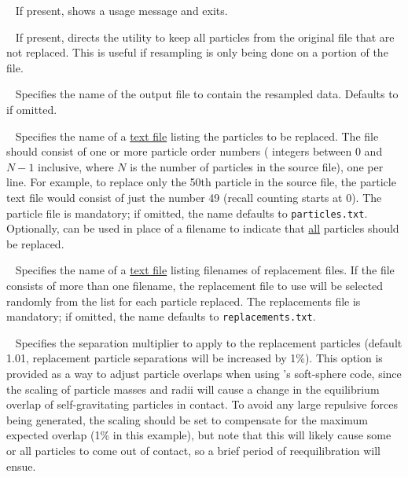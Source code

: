 \begin{description}
\item{} ~ If present, shows a usage message and exits.
\item{} ~ If present, directs the utility to keep all
  particles from the original  file that are not replaced.
  This is useful if resampling is only being done on a portion of the
   file.
\item{} ~ Specifies the name of the output
   file to contain the resampled data.  Defaults to
   if omitted.
\item{} ~ Specifies the name of a
  \underline{text file} listing the particles to be replaced.  The
  file should consist of one or more particle order numbers (\ie
  integers between 0 and $N - 1$ inclusive, where $N$ is the number of
  particles in the source file), one per line.  For example, to
  replace only the 50th particle in the source file, the particle text
  file would consist of just the number 49 (recall counting starts at
  0).  The particle file is mandatory; if omitted, the name defaults
  to \texttt{particles.txt}.  Optionally,  can be used in
  place of a filename to indicate that \underline{all} particles
  should be replaced.
\item{} ~ Specifies the name of a
  \underline{text file} listing filenames of replacement 
  files.  If the file consists of more than one  filename,
  the replacement  file to use will be selected randomly from
  the list for each particle replaced.  The replacements file is
  mandatory; if omitted, the name defaults to
  \texttt{replacements.txt}.
\item{} ~ Specifies the separation multiplier
  to apply to the replacement particles (default 1.01, \ie replacement
  particle separations will be increased by 1\%).  This option is
  provided as a way to adjust particle overlaps when using \pkd's
  soft-sphere code, since the scaling of particle masses and radii
  will cause a change in the equilibrium overlap of self-gravitating
  particles in contact.  To avoid any large repulsive forces being
  generated, the scaling should be set to compensate for the maximum
  expected overlap (1\% in this example), but note that this will
  likely cause some or all particles to come out of contact, so a
  brief period of reequilibration will ensue.
\end{description}

